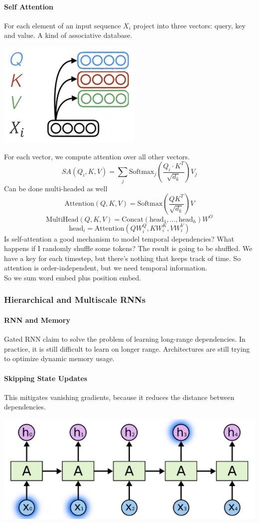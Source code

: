 \documentclass[10pt]{report}
\begin{document}
\paragraph{Self Attention} For each element of an input sequence $X_i$ project into three vectors: query, key and value. A kind of associative database.
\begin{center}
	\includegraphics[scale=0.5]{119.png}
\end{center}
For each vector, we compute attention over all other vectors.
$$SA(Q_i, K, V) = \sum_j\text{Softmax}_j\left(\frac{Q_i\cdot K^T}{\sqrt{d_k}}\right)V_j$$
Can be done multi-headed as well
$$\text{Attention}(Q,K,V)=\text{Softmax}\left(\frac{QK^T}{\sqrt{d_k}}\right)V$$
$$\text{MultiHead}(Q,K,V) = \text{Concat}(\text{head}_1,\ldots,\text{head}_h)W^O$$
$$\text{head}_i = \text{Attention}(QW_i^Q, KW_i^K, VW_i^V)$$
Is self-attention a good mechanism to model temporal dependencies? What happens if I randomly shuffle some tokens? The result is going to be shuffled. We have a key for each timestep, but there's nothing that keeps track of time. So attention is order-independent, but we need temporal information.\\
So we sum word embed plus position embed.
\subsubsection{Hierarchical and Multiscale RNNs}
\paragraph{RNN and Memory} Gated RNN claim to solve the problem of learning long-range dependencies. In practice, it is still difficult to learn on longer range. Architectures are still trying to optimize dynamic memory usage.
\paragraph{Skipping State Updates} This mitigates vanishing gradients, because it reduces the distance between dependencies.
\begin{center}
	\includegraphics[scale=0.5]{120.png}
\end{center}
\end{document}
